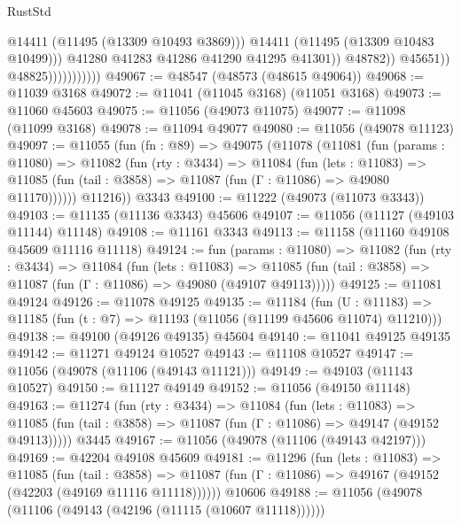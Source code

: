 \begin{lexlean}{RustStd}
\begin{coremodule}
                                          @14411
                                          (@11495 (@13309 @10493 @3869)))
                                        @14411
                                        (@11495 (@13309 @10483 @10499)))
                                      @41280
                                      @41283
                                      @41286
                                      @41290
                                      @41295
                                      @41301))
                                  @48782))
                              @45651))
                          @48825)))))))))))
@49067 := @48547 (@48573 (@48615 @49064))
@49068 := @11039 @3168
@49072 := @11041 (@11045 @3168) (@11051 @3168)
@49073 := @11060 @45603
@49075 := @11056 (@49073 @11075)
@49077 := @11098 (@11099 @3168)
@49078 := @11094 @49077
@49080 := @11056 (@49078 @11123)
@49097 := @11055
    (fun (fn : @89) =>
    @49075
      (@11078
        (@11081
          (fun (params : @11080) =>
          @11082
            (fun (rty : @3434) =>
            @11084
              (fun (lets : @11083) =>
              @11085 (fun (tail : @3858) => @11087 (fun (Γ : @11086) => @49080 @11170))))))
        @11216))
    @3343
@49100 := @11222 (@49073 (@11073 @3343))
@49103 := @11135 (@11136 @3343) @45606
@49107 := @11056 (@11127 (@49103 @11144) @11148)
@49108 := @11161 @3343
@49113 := @11158 (@11160 @49108 @45609 @11116 @11118)
@49124 := fun (params : @11080) =>
  @11082
    (fun (rty : @3434) =>
    @11084
      (fun (lets : @11083) =>
      @11085 (fun (tail : @3858) => @11087 (fun (Γ : @11086) => @49080 (@49107 @49113)))))
@49125 := @11081 @49124
@49126 := @11078 @49125
@49135 := @11184
    (fun (U : @11183) => @11185 (fun (t : @7) => @11193 (@11056 (@11199 @45606 @11074) @11210)))
@49138 := @49100 (@49126 @49135) @45604
@49140 := @11041 @49125 @49135
@49142 := @11271 @49124 @10527
@49143 := @11108 @10527
@49147 := @11056 (@49078 (@11106 (@49143 @11121)))
@49149 := @49103 (@11143 @10527)
@49150 := @11127 @49149
@49152 := @11056 (@49150 @11148)
@49163 := @11274
    (fun (rty : @3434) =>
    @11084
      (fun (lets : @11083) =>
      @11085 (fun (tail : @3858) => @11087 (fun (Γ : @11086) => @49147 (@49152 @49113)))))
    @3445
@49167 := @11056 (@49078 (@11106 (@49143 @42197)))
@49169 := @42204 @49108 @45609
@49181 := @11296
    (fun (lets : @11083) =>
    @11085
      (fun (tail : @3858) =>
      @11087 (fun (Γ : @11086) => @49167 (@49152 (@42203 (@49169 @11116 @11118))))))
    @10606
@49188 := @11056 (@49078 (@11106 (@49143 (@42196 (@11115 (@10607 @11118))))))

\end{coremodule}
\end{lexlean}
